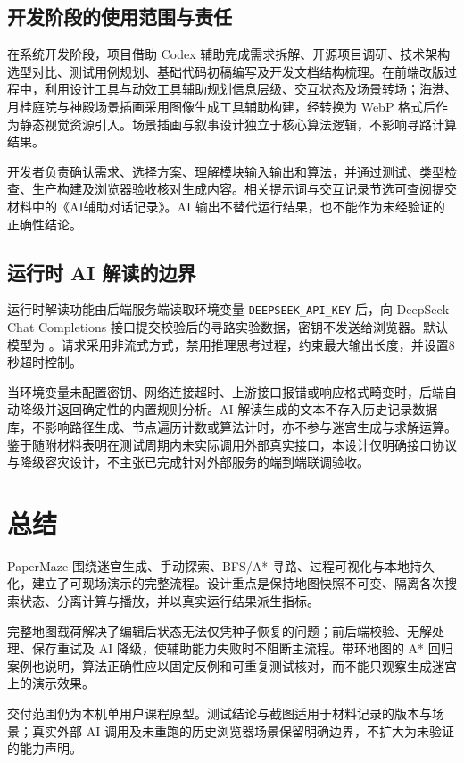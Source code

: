 \documentclass[a4paper]{article}
\begin{document}
\subsection{开发阶段的使用范围与责任}
在系统开发阶段，项目借助 Codex 辅助完成需求拆解、开源项目调研、技术架构选型对比、测试用例规划、基础代码初稿编写及开发文档结构梳理。在前端改版过程中，利用设计工具与动效工具辅助规划信息层级、交互状态及场景转场；海港、月桂庭院与神殿场景插画采用图像生成工具辅助构建，经转换为 WebP 格式后作为静态视觉资源引入。场景插画与叙事设计独立于核心算法逻辑，不影响寻路计算结果。

开发者负责确认需求、选择方案、理解模块输入输出和算法，并通过测试、类型检查、生产构建及浏览器验收核对生成内容。相关提示词与交互记录节选可查阅提交材料中的《AI辅助对话记录》。AI 输出不替代运行结果，也不能作为未经验证的正确性结论。

\subsection{运行时 AI 解读的边界}
运行时解读功能由后端服务端读取环境变量 \texttt{DEEPSEEK\_API\_KEY} 后，向 DeepSeek Chat Completions 接口提交校验后的寻路实验数据，密钥不发送给浏览器。默认模型为 。请求采用非流式方式，禁用推理思考过程，约束最大输出长度，并设置8秒超时控制。

当环境变量未配置密钥、网络连接超时、上游接口报错或响应格式畸变时，后端自动降级并返回确定性的内置规则分析。AI 解读生成的文本不存入历史记录数据库，不影响路径生成、节点遍历计数或算法计时，亦不参与迷宫生成与求解运算。鉴于随附材料表明在测试周期内未实际调用外部真实接口，本设计仅明确接口协议与降级容灾设计，不主张已完成针对外部服务的端到端联调验收。

\section{总结}
PaperMaze 围绕迷宫生成、手动探索、BFS/A* 寻路、过程可视化与本地持久化，建立了可现场演示的完整流程。设计重点是保持地图快照不可变、隔离各次搜索状态、分离计算与播放，并以真实运行结果派生指标。

完整地图载荷解决了编辑后状态无法仅凭种子恢复的问题；前后端校验、无解处理、保存重试及 AI 降级，使辅助能力失败时不阻断主流程。带环地图的 A* 回归案例也说明，算法正确性应以固定反例和可重复测试核对，而不能只观察生成迷宫上的演示效果。

交付范围仍为本机单用户课程原型。测试结论与截图适用于材料记录的版本与场景；真实外部 AI 调用及未重跑的历史浏览器场景保留明确边界，不扩大为未验证的能力声明。
\end{document}
